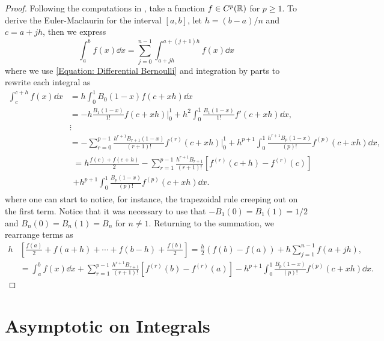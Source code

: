 \begin{proof}
Following the computations in , take a function $f \in C^p(\mathbb{R})$ for $p \geq 1$. To derive the Euler-Maclaurin for the interval $[a,b]$, let $h = (b - a)/n$ and $c = a + j h$, then we express
\begin{equation}
	\int_{a}^{b} f(x) \dd x = \sum_{j=0}^{n-1} \int_{a+j h}^{a+(j+1)h} f(x) \dd x
\end{equation}
where we use \eqref{Equation: Differential Bernoulli} and integration by parts to rewrite each integral as
\begin{align}
	\int_{c}^{c+h} f(x) \dd x & = h \int_{0}^{1} B_0(1-x) f(c+xh) \dd x \\
	& = - h \frac{B_1(1-x)}{1!} f(c + xh) |_0^1 + h^2 \int_{0}^{1} \frac{B_1(1-x)}{1!} f'(c+xh) \dd x, \\
	& \vdots \nonumber \\
	& = - \sum_{r = 0}^{p-1} \frac{h^{r+1} B_{r+1}(1-x)}{(r+1)!} f^{(r)}(c+xh) |_0^1 + h^{p+1} \int_0^1 \frac{h^{r+1} B_{p}(1-x)}{(p)!} f^{(p)}(c+xh) \dd x, \\
	& 
	\begin{multlined}
		= h \frac{f(c) + f(c+h)}{2} - \sum_{r = 1}^{p-1} \frac{h^{r+1} B_{r+1}}{(r+1)!} \left[ f^{(r)}(c+h) - f^{(r)}(c) \right] \\
		+ h^{p+1} \int_0^1 \frac{B_{p}(1-x)}{(p)!} f^{(p)}(c+xh) \dd x. 
	\end{multlined}
\end{align}
where one can start to notice, for instance, the trapezoidal rule creeping out on the first term. Notice that it was necessary to use that $ - B_1(0) = B_1(1) = 1/2$ and $B_n(0) = B_n(1) = B_n$ for $n\neq1$. Returning to the summation, we rearrange terms as
\begin{align}
	h & \left[ \frac{f(a)}{2} + f(a+h) + \cdots + f(b-h) + \frac{f(b)}{2} \right] = \frac{h}{2} (f(b) - f(a)) + h \sum_{j=1}^{n-1} f(a + j h), \\
	& = \int_{a}^{b} f(x) \dd x + \sum_{r = 1}^{p-1} \frac{h^{r+1} B_{r+1}}{(r+1)!} \left[ f^{(r)}(b) - f^{(r)}(a) \right] - h^{p+1} \int_0^1 \frac{B_{p}(1-x)}{(p)!} f^{(p)}(c+xh) \dd x. 
\end{align}
\end{proof}

\section{Asymptotic on Integrals}

